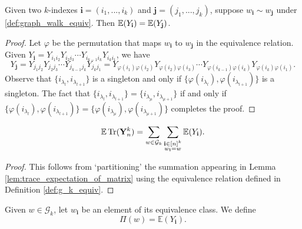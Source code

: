 \begin{lemma}[$\mathbf{i} \sim \mathbf{j} \Rightarrow \mathbb{E}(Y_\mathbf{i}) = \mathbb{E}(Y_\mathbf{j})$ : R-1-7 : lem:eq\_equiv\_eq\_expect]
  \label{lem:eq_equiv_eq_expect}
  Given two $k$-indexes $\mathbf{i} = (i_1,...,i_k)$ and $\mathbf{j} = (j_1,...,j_k)$,
  suppose $w_{\mathbf{i}} \sim w_{\mathbf{j}}$ under \ref{def:graph_walk_equiv}.
  Then $\mathbb{E} (Y_\mathbf{i}) = \mathbb{E} (Y_{\mathbf{j}})$.
\end{lemma}

\begin{proof}
  Let $\varphi$ be the permutation that maps $w_\mathbf{i}$ to $w_{\mathbf{j}}$ in the equivalence
  relation. Given $Y_\mathbf{i} = Y_{i_1 i_2}Y_{i_2 i_3} \cdots Y_{i_{k-1} i_k}Y_{i_k i_1}$, we have
  \[
  Y_{\mathbf{j}} = Y_{j_1 j_2}Y_{j_2 j_3} \cdots Y_{j_{k-1} j_k}Y_{j_k j_1}
  = Y_{\varphi(i_1) \varphi(i_2)}Y_{\varphi(i_2) \varphi(i_3)} \cdots Y_{\varphi(i_{k-1}) \varphi(i_k)}Y_{\varphi(i_k) \varphi(i_1)}.
  \]
  Observe that $\{ i_{\lambda_l},i_{\lambda_{l+1}} \}$ is a singleton and only if
  $\{ \varphi(i_{\lambda_l}),\varphi(i_{\lambda_{l+1}}) \}$ is a singleton.
  The fact that $\{ i_{\lambda_l},i_{\lambda_{l+1}} \} = \{ i_{\lambda_\mu},i_{\lambda_{\mu+1}} \}$
  if and only if $\{ \varphi(i_{\lambda_l}),\varphi(i_{\lambda_{l+1}}) \} = \{ \varphi(i_{\lambda_\mu}),\varphi(i_{\lambda_{\mu+1}}) \}$
  completes the proof.
\end{proof}


\begin{lemma}
  \label{lem:equation_4.5_1}
  \[
  \mathbb{E} \operatorname{Tr} (\mathbf{Y}_n^k)
  = \sum_{w \in \mathcal{G}_k} \sum_{\substack{\mathbf{i} \in [n]^k \\ w_\mathbf{i} = w}} \mathbb{E} (Y_\mathbf{i}).
  \]
\end{lemma}

\begin{proof}
  This follows from `partitioning' the summation appearing in Lemma \ref{lem:trace_expectation_of_matrix} using the equivalence relation defined in Definition \ref{def:g_k_equiv}.
\end{proof}


\begin{definition}[$\Pi (G,w)$: R-1-11 : def:Pi.G.w]
  \label{def:Pi.G.w}
  Given $w \in \mathcal{G}_k$, let $w_{\mathbf{i}}$ be an element of its equivalence class. We define
  \[
  \Pi (w) = \mathbb{E}(Y_\mathbf{i}).
  \]
\end{definition}


